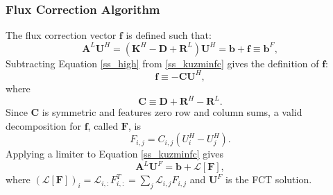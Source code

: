 \subsubsection{Flux Correction Algorithm}
The flux correction vector $\mathbf{f}$ is defined such that:
\begin{equation}\label{ss_kuzminfc}
   \mathbf{A}^L\mathbf{U}^H = (\mathbf{K}^H - \mathbf{D} + \mathbf{R}^L)\mathbf{U}^H = \mathbf{b} + \mathbf{f} \equiv \mathbf{b}^F,
\end{equation}
Subtracting Equation \ref{ss_high} from \ref{ss_kuzminfc} gives the definition of
$\mathbf{f}$:
\begin{equation}\label{ss_kuzminFdef}
   \mathbf{f} \equiv -\mathbf{C}\mathbf{U}^H,
\end{equation}
where
\begin{equation}
   \mathbf{C}\equiv \mathbf{D} + \mathbf{R}^H - \mathbf{R}^L.
\end{equation}
Since $\mathbf{C}$ is symmetric
and features zero row and column sums, a valid decomposition for $\mathbf{f}$,
called $\mathbf{F}$, is
\begin{equation}
   F_{i,j} = C_{i,j}(U^H_i - U^H_j).
\end{equation}
Applying a limiter to Equation \ref{ss_kuzminfc} gives
\begin{equation}\label{ss_limited}
   \mathbf{A}^L\mathbf{U}^F = \mathbf{b} + \mathcal{L}[\mathbf{F}],
\end{equation}
where $(\mathcal{L}[\mathbf{F}])_i = \mathcal{L}_{i,:}F_{i,:}^T
= \sum\limits_j \mathcal{L}_{i,j}F_{i,j}$ and $\mathbf{U}^F$ is the FCT solution.

